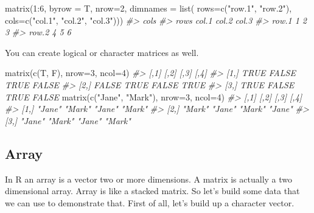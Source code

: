 \documentclass[
]{book}
\newenvironment{Shaded}{\begin{snugshade}}{\end{snugshade}}
\newcommand{\AttributeTok}[1]{\textcolor[rgb]{0.77,0.63,0.00}{#1}}
\newcommand{\CommentTok}[1]{\textcolor[rgb]{0.56,0.35,0.01}{\textit{#1}}}
\newcommand{\DecValTok}[1]{\textcolor[rgb]{0.00,0.00,0.81}{#1}}
\newcommand{\FunctionTok}[1]{\textcolor[rgb]{0.00,0.00,0.00}{#1}}
\newcommand{\NormalTok}[1]{#1}
\newcommand{\SpecialCharTok}[1]{\textcolor[rgb]{0.00,0.00,0.00}{#1}}
\newcommand{\StringTok}[1]{\textcolor[rgb]{0.31,0.60,0.02}{#1}}
\begin{document}
\begin{Shaded}
\begin{Highlighting}[]
\FunctionTok{matrix}\NormalTok{(}\DecValTok{1}\SpecialCharTok{:}\DecValTok{6}\NormalTok{, }\AttributeTok{byrow =}\NormalTok{ T, }\AttributeTok{nrow=}\DecValTok{2}\NormalTok{, }
       \AttributeTok{dimnames =} \FunctionTok{list}\NormalTok{(}
         \AttributeTok{rows=}\FunctionTok{c}\NormalTok{(}\StringTok{"row.1"}\NormalTok{, }\StringTok{"row.2"}\NormalTok{), }
         \AttributeTok{cols=}\FunctionTok{c}\NormalTok{(}\StringTok{"col.1"}\NormalTok{, }\StringTok{"col.2"}\NormalTok{, }\StringTok{"col.3"}\NormalTok{)))}
\CommentTok{\#\textgreater{}        cols}
\CommentTok{\#\textgreater{} rows    col.1 col.2 col.3}
\CommentTok{\#\textgreater{}   row.1     1     2     3}
\CommentTok{\#\textgreater{}   row.2     4     5     6}
\end{Highlighting}
\end{Shaded}

You can create logical or character matrices as well.

\begin{Shaded}
\begin{Highlighting}[]
\FunctionTok{matrix}\NormalTok{(}\FunctionTok{c}\NormalTok{(T, F), }\AttributeTok{nrow=}\DecValTok{3}\NormalTok{, }\AttributeTok{ncol=}\DecValTok{4}\NormalTok{)}
\CommentTok{\#\textgreater{}       [,1]  [,2]  [,3]  [,4]}
\CommentTok{\#\textgreater{} [1,]  TRUE FALSE  TRUE FALSE}
\CommentTok{\#\textgreater{} [2,] FALSE  TRUE FALSE  TRUE}
\CommentTok{\#\textgreater{} [3,]  TRUE FALSE  TRUE FALSE}
\FunctionTok{matrix}\NormalTok{(}\FunctionTok{c}\NormalTok{(}\StringTok{"Jane"}\NormalTok{, }\StringTok{"Mark"}\NormalTok{), }\AttributeTok{nrow=}\DecValTok{3}\NormalTok{, }\AttributeTok{ncol=}\DecValTok{4}\NormalTok{)}
\CommentTok{\#\textgreater{}      [,1]   [,2]   [,3]   [,4]  }
\CommentTok{\#\textgreater{} [1,] "Jane" "Mark" "Jane" "Mark"}
\CommentTok{\#\textgreater{} [2,] "Mark" "Jane" "Mark" "Jane"}
\CommentTok{\#\textgreater{} [3,] "Jane" "Mark" "Jane" "Mark"}
\end{Highlighting}
\end{Shaded}

\hypertarget{array}{%
\subsection{Array}\label{array}}

In R an array is a vector two or more dimensions. A matrix is actually a two dimensional array. Array is like a stacked matrix. So let's build some data that we can use to demonstrate that. First of all, let's build up a character vector.
\end{document}
